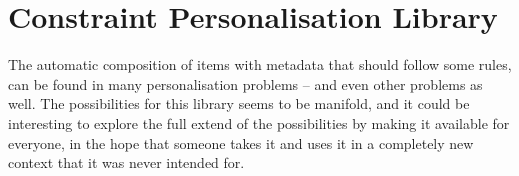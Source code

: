 \section{Constraint Personalisation Library}
The automatic composition of items with metadata that should follow some rules, can be found in many personalisation problems -- and even other problems as well. The possibilities for this library seems to be manifold, and it could be interesting to explore the full extend of the possibilities by making it available for everyone, in the hope that someone takes it and uses it in a completely new context that it was never intended for.
%
%
%
%
%
%
%
%
%
%
%
%
%
%
%
%
%
%

